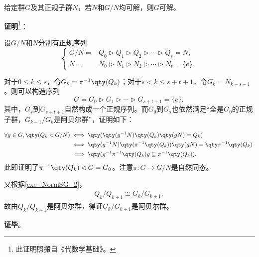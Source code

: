 \begin{lemma}{}\label{lem_SlvbGp_1}
给定群$G$及其正规子群$N$，若$N$和$G/N$均可解，则$G$可解。
\end{lemma}


\textbf{证明}\footnote{此证明照搬自《代数学基础》。}：

设$G/N$和$N$分别有正规序列
\begin{equation}
    \left\{
    \begin{aligned}
        G/N ={}& Q_0\rhd Q_1\rhd Q_2\rhd\cdots\rhd Q_s=N, \\
        N ={}& N_0\rhd N_1\rhd N_2\rhd\cdots\rhd N_t=\{e\}. 
    \end{aligned}
    \right. ~
\end{equation}

对于$0\leq k\leq s$，令$G_k=\pi^{-1}\qty(Q_k)$；对于$s<k\leq s+t+1$，令$G_k=N_{k-s-1}$。则可以构造序列
\begin{equation}
    G=G_0\rhd G_1\rhd\cdots\rhd G_{s+t+1}=\{e\}. ~
\end{equation}
其中，$G_s$到$G_{s+t+1}$自然构成一个正规序列。而$G_0$到$G_s$也依然满足“全是$G_0$的正规子群，$G_{k-1}/G_{k}$是阿贝尔群”，证明如下：

\begin{equation}
\begin{aligned}
    \forall g\in G, \qty(Q_k\lhd G/N) \iff{}& \qty(\qty(g^{-1}N)\qty(Q_k)\qty(gN)=Q_k)\\
    \iff{}& \qty(g^{-1}N)\qty(\pi^{-1}\qty(Q_k))\qty(gN)=\qty\pi^{-1}\qty(Q_k)\\
    \implies{}& \qty(g^{-1}\pi^{-1}\qty(Q_k)g\subseteq \pi^{-1}\qty(Q_k)). 
\end{aligned}~
\end{equation}
此即证明了$\pi^{-1}\qty(Q_k)\lhd G=G_0$。注意$\pi: G\to G/N$是自然同态。

又根据\autoref{exe_NormSG_2}，
\begin{equation}
    \begin{aligned}
        Q_k/Q_{k+1} \cong G_k/G_{k+1}. 
    \end{aligned}~
\end{equation}
故由$Q_k/Q_{k+1}$是阿贝尔群，得证$G_k/G_{k+1}$是阿贝尔群。


\textbf{证毕}。

















